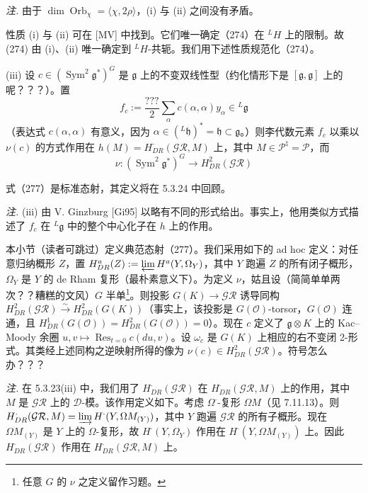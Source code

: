 \emph{注.} 由于 $\dim\operatorname{Orb}_{\chi}=\langle\chi,2\rho\rangle$，(i) 与 (ii) 之间没有矛盾。

性质 (i) 与 (ii) 可在 [MV] 中找到。它们唯一确定（274）在 ${}^{L}H$ 上的限制。故 (274) 由 (i)、(ii) 唯一确定到 ${}^{L}H$-共轭。我们用下述性质规范化（274）。

(iii) 设 $c\in(\operatorname{Sym}^2\mathfrak{g}^*)^G$ 是 $\mathfrak{g}$ 上的不变双线性型（约化情形下是 $[\mathfrak{g},\mathfrak{g}]$ 上的呢？？？）。置
\begin{equation}\tag{276}
f_c:=\frac{???}{2}\sum_{\alpha}c(\alpha,\alpha)y_{\alpha}\in{}^{L}\mathfrak{g}
\end{equation}
（表达式 $c(\alpha,\alpha)$ 有意义，因为 $\alpha\in({}^{L}\mathfrak{h})^*=\mathfrak{h}\subset\mathfrak{g}$。）则李代数元素 $f_c$ 以乘以 $\nu(c)$ 的方式作用在 $h(M)=H^{\cdot}_{DR}(\mathcal{GR},M)$ 上，其中 $M\in\mathcal{P}^{\natural}=\mathcal{P}$，而
\begin{equation}\tag{277}
\nu:(\operatorname{Sym}^2\mathfrak{g}^*)^G\to H^2_{DR}(\mathcal{GR})
\end{equation}


式（277）是标准态射，其定义将在 5.3.24 中回顾。

\emph{注.} (iii) 由 V. Ginzburg [Gi95] 以略有不同的形式给出。事实上，他用类似方式描述了 $f_c$ 在 ${}^{L}\mathfrak{g}$ 中的整个中心化子在 $h$ 上的作用。

 本小节（读者可跳过）定义典范态射（277）。我们采用如下的 ad hoc 定义：对任意归纳概形 $Z$，置 $H^a_{DR}(Z):=\varprojlim H^a(Y,\Omega_Y)$，其中 $Y$ 跑遍 $Z$ 的所有闭子概形，$\Omega_Y$ 是 $Y$ 的 de Rham 复形（最朴素意义下）。为定义 $\nu$，姑且设（简简单单两次？？糟糕的文风）$G$ 半单\footnote{任意 $G$ 的 $\nu$ 之定义留作习题。}。则投影 $G(K)\to\mathcal{GR}$ 诱导同构 $H^2_{DR}(\mathcal{GR})\xrightarrow{\sim}H^2_{DR}(G(K))$（事实上，该投影是 $G(\mathcal{O})$-torsor，$G(\mathcal{O})$ 连通，且 $H^1_{DR}(G(\mathcal{O}))=H^2_{DR}(G(\mathcal{O}))=0$）。现在 $c$ 定义了 $\mathfrak{g}\otimes K$ 上的 Kac–Moody 余圈 $u,v\mapsto\operatorname{Res}_{t=0}c(du,v)$。设 $\omega_c$ 是 $G(K)$ 上相应的右不变闭 2-形式。其类经上述同构之逆映射所得的像为 $\nu(c)\in H^2_{DR}(\mathcal{GR})$。符号怎么办？？？

\emph{注.} 在 5.3.23(iii) 中，我们用了 $H^{\cdot}_{DR}(\mathcal{GR})$ 在 $H^{\cdot}_{DR}(\mathcal{GR},M)$ 上的作用，其中 $M$ 是 $\mathcal{GR}$ 上的 $\mathcal{D}$-模。该作用定义如下。考虑 $\Omega^{\cdot}$-复形 $\Omega M$（见 7.11.13）。则 $H^{\cdot}_{DR}(\mathcal{GR},M)=\varinjlim H^{\cdot}(Y,\Omega M_{(Y)})$，其中 $Y$ 跑遍 $\mathcal{GR}$ 的所有子概形。现在 $\Omega M_{(Y)}$ 是 $Y$ 上的 $\Omega$-复形，故 $H^{\cdot}(Y,\Omega_Y)$ 作用在 $H^{\cdot}(Y,\Omega M_{(Y)})$ 上。因此 $H^{\cdot}_{DR}(\mathcal{GR})$ 作用在 $H^{\cdot}_{DR}(\mathcal{GR},M)$ 上。

